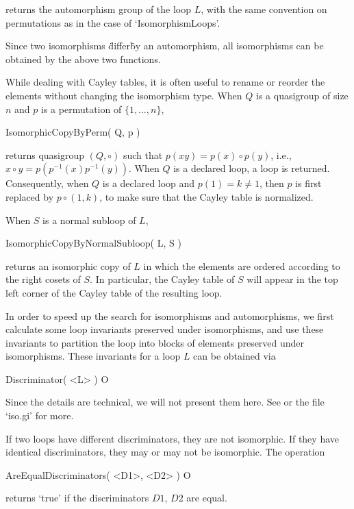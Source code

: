 returns the automorphism group of the loop $L$, with the same convention on
permutations as in the case of `IsomorphismLoops'.

Since two isomorphisms \"differ\" by an automorphism, all isomorphisms can be
obtained by the above two functions.

While dealing with Cayley tables, it is often useful to rename or reorder the
elements without changing the isomorphism type. When $Q$ is a quasigroup of
size $n$ and $p$ is a permutation of $\{1,\dots,n\}$,

\>IsomorphicCopyByPerm( Q, p )

returns quasigroup $(Q,\circ)$ such that $p(xy) = p(x)\circ p(y)$, i.e.,
$x\circ y = p( p^{-1}(x)p^{-1}(y))$. When $Q$ is a declared loop, a loop is
returned. Consequently, when $Q$ is a declared loop and $p(1) = k\ne 1$, then
$p$ is first replaced by $p\circ (1,k)$, to make sure that the Cayley table is
normalized.

When $S$ is a normal subloop of $L$,

\>IsomorphicCopyByNormalSubloop( L, S )

returns an isomorphic copy of $L$ in which the elements are ordered according
to the right cosets of $S$. In particular, the Cayley table of $S$ will appear
in the top left corner of the Cayley table of the resulting loop.


In order to speed up the search for isomorphisms and automorphisms, we first
calculate some loop invariants preserved under isomorphisms, and use these
invariants to partition the loop into blocks of elements preserved under
isomorphisms. These invariants for a loop $L$ can be obtained via

\>Discriminator( <L> ) O

Since the details are technical, we will not present them here. See \cite{Vo}
or the file `iso.gi' for more.

If two loops have different discriminators, they are not isomorphic. If they
have identical discriminators, they may or may not be isomorphic. The operation

\>AreEqualDiscriminators( <D1>, <D2> ) O

returns `true' if the discriminators $D1$, $D2$ are equal.


